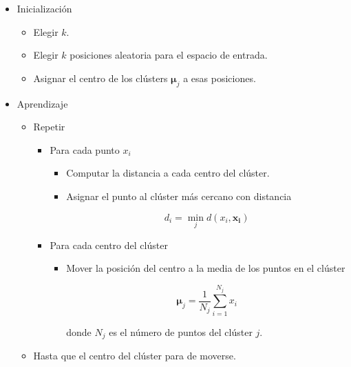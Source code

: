 \begingroup
\myfont
\begin{itemize}
\item Inicialización

\begin{itemize}
\item Elegir $k$.
\item Elegir $k$ posiciones aleatoria para el espacio de entrada.
\item Asignar el centro de los clústers $\mathbf{\mu}_j$ a esas posiciones.
\end{itemize}

\item Aprendizaje

\begin{itemize}
\item Repetir

\begin{itemize}
\item Para cada punto $x_i$

\begin{itemize}
\item Computar la distancia a cada centro del clúster.
\item Asignar el punto al clúster más cercano con distancia

\begin{equation}
d_i = \min_j d(x_i, \mathbf{x_i})
\end{equation}
\end{itemize}

\item Para cada centro del clúster

\begin{itemize}
\item Mover la posición del centro a la media de los puntos en el clúster

\begin{equation}
\mathbf{\mu}_j = \dfrac{1}{N_j} \sum_{i=1}^{N_j} x_i
\end{equation}

donde $N_j$ es el número de puntos del clúster $j$.
\end{itemize}

\end{itemize}

\item Hasta que el centro del clúster para de moverse.

\end{itemize}

\end{itemize}  

